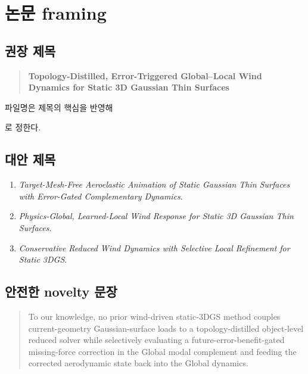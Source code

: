 \documentclass[11pt,a4paper]{article}
\begin{document}
\section{논문 framing}

\subsection{권장 제목}

\begin{quote}
\textbf{Topology-Distilled, Error-Triggered Global--Local Wind Dynamics
for Static 3D Gaussian Thin Surfaces}
\end{quote}

파일명은 제목의 핵심을 반영해

\begin{center}
\end{center}

로 정한다.

\subsection{대안 제목}

\begin{enumerate}[leftmargin=1.7em]
  \item \emph{Target-Mesh-Free Aeroelastic Animation of Static Gaussian Thin Surfaces
  with Error-Gated Complementary Dynamics}.
  \item \emph{Physics-Global, Learned-Local Wind Response for Static 3D Gaussian Thin Surfaces}.
  \item \emph{Conservative Reduced Wind Dynamics with Selective Local Refinement for Static 3DGS}.
\end{enumerate}

\subsection{안전한 novelty 문장}

\begin{quote}
To our knowledge, no prior wind-driven static-3DGS method couples
current-geometry Gaussian-surface loads to a topology-distilled object-level
reduced solver while selectively evaluating a future-error-benefit-gated
missing-force correction in the Global modal complement and feeding the
corrected aerodynamic state back into the Global dynamics.
\end{quote}
\end{document}
